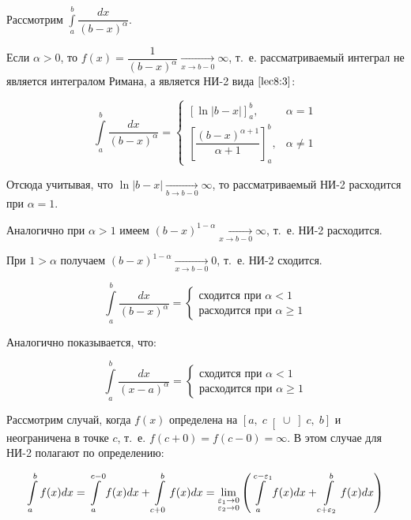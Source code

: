 \documentclass[../../main.tex]{subfiles}
\begin{document}
\begin{exmp}
 Рассмотрим $\displaystyle\int\limits_{a}^{b}\dfrac{dx}{(b - x)^{\alpha}}$.
 
 Если $\alpha > 0$, то $f(x) = \dfrac{1}{(b -x)^{\alpha}} \xrightarrow[x \to b 
 - 0]{} \infty$, т.~е. рассматриваемый интеграл не является интегралом Римана, 
 а является НИ-2 вида $\eqref{lec8:3}$:
 
 \[\int\limits_{a}^{b}\dfrac{dx}{(b - x)^{\alpha}} =
 \begin{cases}
 \left[\ln|b - x|\right]_{a}^{b},& \alpha = 1\\
 \left[\dfrac{(b - x)^{\alpha + 1}}{\alpha + 1}\right]_{a}^{b},& \alpha 
 \neq 1 
\end{cases}\]

Отсюда учитывая, что $\ln|b - x| \xrightarrow[b \to b - 0]{} \infty$, то 
рассматриваемый НИ-2 расходится при $\alpha = 1$.

Аналогично при $\alpha > 1$ имеем $(b - x)^{1- \alpha} \xrightarrow[x \to b - 0]{} 
\infty$, т.~е. НИ-2 расходится.

При $1 > \alpha$ получаем $(b - x)^{1 - \alpha} \xrightarrow[x \to b - 0]{} 0$, т.~е. НИ-2 
сходится.

\[\int\limits_{a}^{b} \dfrac{dx}{(b - x)^{\alpha}} = 
\begin{cases}
\text{сходится при } \alpha < 1\\
\text{расходится при } \alpha \geq 1
\end{cases}\]

Аналогично показывается, что:

\[\int\limits_{a}^{b} \dfrac{dx}{(x - a)^{\alpha}} = 
\begin{cases}
\text{сходится при } \alpha < 1\\
\text{расходится при } \alpha \geq 1
\end{cases}\]
\end{exmp}

Рассмотрим случай, когда $f(x)$ определена на $\left[a,\; c \right[ \cup 
\left] c,\; b \right]$ и неограничена в точке $c$, т.~е. $f(c + 0) = f(c - 0) 
= \infty$. В этом случае для НИ-2 полагают по определению:

\begin{equation} \label{lec8:5}
\int\limits_{a}^{b}f(x)dx = \int\limits_{a}^{c - 0}f(x)dx + \int\limits_{c + 
0}^{b}f(x)dx = \lim_{\substack{
\varepsilon_1 \to 0\\
\varepsilon_2 \to 0}}
\left(\int\limits_{a}^{c - \varepsilon_1}f(x)dx + \int\limits_{c + 
\varepsilon_2}^{b}f(x)dx\right)
\end{equation}
\end{document}
